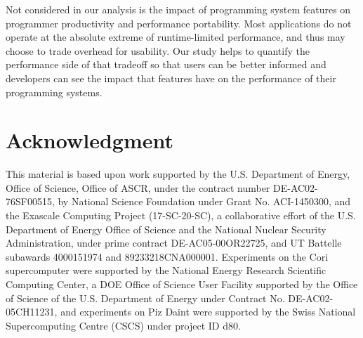 
Not considered in our analysis is the impact of programming system
features on programmer productivity and performance portability. Most
applications do not operate at the absolute extreme of runtime-limited
performance, and thus may choose to trade overhead for
usability. Our study helps to quantify the performance side of that
tradeoff so that users can be better informed and developers can see
the impact that features have on the performance of their programming
systems.

\section*{Acknowledgment}

This material is based upon work supported by the U.S. Department of
Energy, Office of Science, Office of ASCR, under the contract number
DE-AC02-76SF00515, by National Science Foundation under Grant
No. ACI-1450300, and the Exascale Computing Project (17-SC-20-SC), a
collaborative effort of the U.S. Department of Energy Office of
Science and the National Nuclear Security Administration, under prime
contract DE-AC05-00OR22725, and UT Battelle subawards 4000151974 and
89233218CNA000001. Experiments on the Cori supercomputer were
supported by the National Energy Research Scientific Computing Center,
a DOE Office of Science User Facility supported by the Office of
Science of the U.S. Department of Energy under Contract
No. DE-AC02-05CH11231, and experiments on Piz Daint were supported by
the Swiss National Supercomputing Centre (CSCS) under project ID d80.
